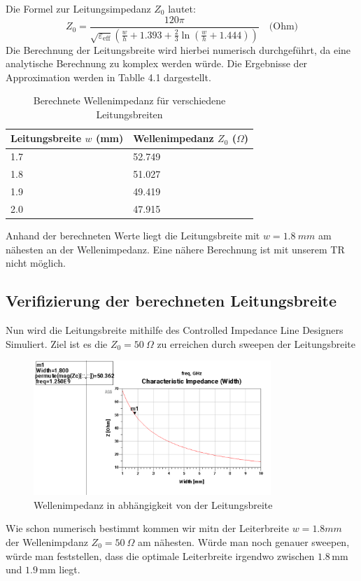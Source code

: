 Die Formel zur Leitungsimpedanz $Z_0$ lautet:
\begin{equation}
Z_0 = \frac{120 \pi}{\sqrt{\varepsilon_{\text{eff}}} \left( \frac{w}{h} + 1.393 + \frac{2}{3} \ln\left( \frac{w}{h} + 1.444 \right) \right)} \quad \text{(Ohm)}
\end{equation}
Die Berechnung der Leitungsbreite wird hierbei numerisch durchgeführt, da eine analytische Berechnung zu
komplex werden würde. Die Ergebnisse der Approximation werden in Tablle 4.1 dargestellt. \\
    
    \begin{table}[H]
        \centering
        \begin{tabular}{|l|l|}
            \hline
            \textbf{Leitungsbreite $w$ (mm)} & \textbf{Wellenimpedanz $Z_0$ ($\Omega$)} \\
            \hline
            1.7 & 52.749 \\
            1.8 & 51.027 \\
            1.9 & 49.419 \\
            2.0 & 47.915 \\
           
            \hline
        \end{tabular}
        \caption{Berechnete Wellenimpedanz für verschiedene Leitungsbreiten}
    \end{table}
    Anhand der berechneten Werte liegt die Leitungsbreite mit $w = 1.8~mm$ am nähesten an der Wellenimpedanz.
    Eine nähere Berechnung ist mit unserem TR nicht möglich. 

       

    \subsection{Verifizierung der berechneten Leitungsbreite}
    Nun wird die Leitungsbreite mithilfe des Controlled Impedance Line Designers Simuliert.
    Ziel ist es die $Z_0 = 50~\Omega$ zu erreichen durch sweepen der Leitungsbreite
    \begin{figure}[H]
        \centering
        \includegraphics[width=0.8\textwidth]{Pictures/LeitungsbreitenSweep.png}
        \caption{Wellenimpedanz in abhängigkeit von der Leitungsbreite}
    \end{figure}
    Wie schon numerisch bestimmt kommen wir mitn der Leiterbreite $w=1.8mm$ der Wellenimpdanz $Z_0 = 50~\Omega$
    am nähesten. Würde man noch genauer sweepen, würde man feststellen, dass die optimale Leiterbreite irgendwo zwischen
    $1.8\,\mathrm{mm}$ und $1.9\,\mathrm{mm}$ liegt.

